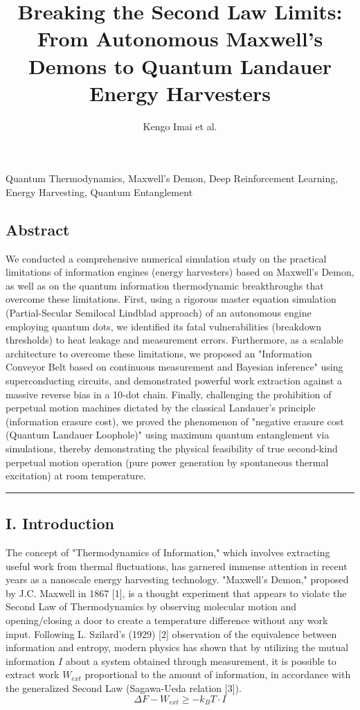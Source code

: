 \documentclass[a4paper,11pt]{article}
\title{Breaking the Second Law Limits: From Autonomous Maxwell's Demons to Quantum Landauer Energy Harvesters}
\author{Kengo Imai et al.}
\date{}
\begin{document}
\maketitle
\begin{center}
  Quantum Thermodynamics, Maxwell's Demon, Deep Reinforcement Learning, Energy Harvesting, Quantum Entanglement
\end{center}
\vspace{1em}

\subsection*{Abstract}
We conducted a comprehensive numerical simulation study on the practical limitations of information engines (energy harvesters) based on Maxwell's Demon, as well as on the quantum information thermodynamic breakthroughs that overcome these limitations. First, using a rigorous master equation simulation (Partial-Secular Semilocal Lindblad approach) of an autonomous engine employing quantum dots, we identified its fatal vulnerabilities (breakdown thresholds) to heat leakage and measurement errors. Furthermore, as a scalable architecture to overcome these limitations, we proposed an "Information Conveyor Belt based on continuous measurement and Bayesian inference" using superconducting circuits, and demonstrated powerful work extraction against a massive reverse bias in a 10-dot chain. Finally, challenging the prohibition of perpetual motion machines dictated by the classical Landauer's principle (information erasure cost), we proved the phenomenon of "negative erasure cost (Quantum Landauer Loophole)" using maximum quantum entanglement via simulations, thereby demonstrating the physical feasibility of true second-kind perpetual motion operation (pure power generation by spontaneous thermal excitation) at room temperature.

\vspace{1em}\hrule\vspace{1em}

\subsection*{I. Introduction}
The concept of "Thermodynamics of Information," which involves extracting useful work from thermal fluctuations, has garnered immense attention in recent years as a nanoscale energy harvesting technology. "Maxwell's Demon," proposed by J.C. Maxwell in 1867 [1], is a thought experiment that appears to violate the Second Law of Thermodynamics by observing molecular motion and opening/closing a door to create a temperature difference without any work input. Following L. Szilard's (1929) [2] observation of the equivalence between information and entropy, modern physics has shown that by utilizing the mutual information $I$ about a system obtained through measurement, it is possible to extract work $W_{ext}$ proportional to the amount of information, in accordance with the generalized Second Law (Sagawa-Ueda relation [3]).
\begin{equation} \Delta F - W_{ext} \geq -k_B T \cdot I \end{equation}
\end{document}
